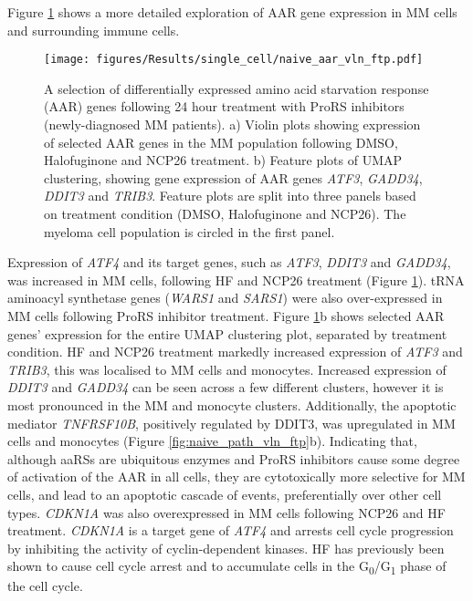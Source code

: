 Figure \ref{fig:naive_aar_vln_ftp} shows a more detailed exploration of AAR gene expression in MM cells and surrounding immune cells.
%
\begin{figure}[htb]
\centering
\texttt{[image: figures/Results/single\_cell/naive\_aar\_vln\_ftp.pdf]}
\caption[Differentially expressed AAR genes- newly diagnosed MM]{A selection of differentially expressed amino acid starvation response (AAR) genes following 24 hour treatment with ProRS inhibitors (newly-diagnosed MM patients).
    a) Violin plots showing expression of selected AAR genes in the MM population following DMSO, Halofuginone and NCP26 treatment.
    b) Feature plots of UMAP clustering, showing gene expression of AAR genes \textit{ATF3}, \textit{GADD34}, \textit{DDIT3} and \textit{TRIB3}.
Feature plots are split into three panels based on treatment condition (DMSO, Halofuginone and NCP26).
The myeloma cell population is circled in the first panel.}
\label{fig:naive_aar_vln_ftp}
\end{figure}
Expression of \textit{ATF4} and its target genes, such as \textit{ATF3}, \textit{DDIT3} and  \textit{GADD34}, was increased in MM cells, following HF and NCP26 treatment (Figure \ref{fig:naive_aar_vln_ftp}).
tRNA aminoacyl synthetase genes (\textit{WARS1} and \textit{SARS1}) were also over-expressed in MM cells following ProRS inhibitor treatment.
Figure \ref{fig:naive_aar_vln_ftp}b shows selected AAR genes' expression for the entire UMAP clustering plot, separated by treatment condition.
HF and NCP26 treatment markedly increased expression of \textit{ATF3} and \textit{TRIB3}, this was localised to MM cells and monocytes.
Increased expression of \textit{DDIT3} and \textit{GADD34} can be seen across a few different clusters, however it is most pronounced in the MM and monocyte clusters.
Additionally, the apoptotic mediator \textit{TNFRSF10B}, positively regulated by DDIT3, was upregulated in MM cells and monocytes (Figure \ref{fig:naive_path_vln_ftp}b).
Indicating that, although aaRSs are ubiquitous enzymes and ProRS inhibitors cause some degree of activation of the AAR in all cells, they are cytotoxically more selective for MM cells, and lead to an apoptotic cascade of events, preferentially over other cell types.
\textit{CDKN1A} was also overexpressed in MM cells following NCP26 and HF treatment.
\textit{CDKN1A} is a target gene of \textit{ATF4} and arrests cell cycle progression by inhibiting the activity of cyclin-dependent kinases.
HF has previously been shown to cause cell cycle arrest and to accumulate cells in the G\textsubscript{0}/G\textsubscript{1} phase of the cell cycle.
